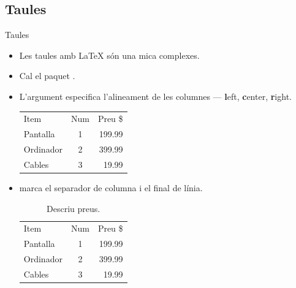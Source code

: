 \subsection{Taules}
\begin{frame}[fragile]{Taules}
\begin{itemize}
\item Les taules amb \LaTeX{} són una mica complexes.
\item Cal el paquet .
\item L'argument especifica l'alineament de les columnes --- \textbf{l}eft, \textbf{c}enter, \textbf{r}ight.
\begin{exampletwouptiny2}
\begin{tabular}{lcr}
    Item      & Num & Preu \$ \\
    Pantalla  & 1   & 199.99  \\
    Ordinador & 2   & 399.99  \\
    Cables    & 3   & 19.99   \\
\end{tabular}
\end{exampletwouptiny2}
\item \keystrokebftt{\&} marca el separador de columna i \keystrokebftt{\bs\bs} el final de línia.
\begin{exampletwouptiny2}
\begin{table}
    \centering %
    \caption{Descriu preus.}
    \begin{tabular}{lcr}
        Item      & Num & Preu \$ \\
        Pantalla  & 1   & 199.99  \\
        Ordinador & 2   & 399.99  \\
        Cables    & 3   & 19.99   \\
    \end{tabular}
    \label{taula:items}
\end{table}
\end{exampletwouptiny2}
\end{itemize}
\end{frame}

